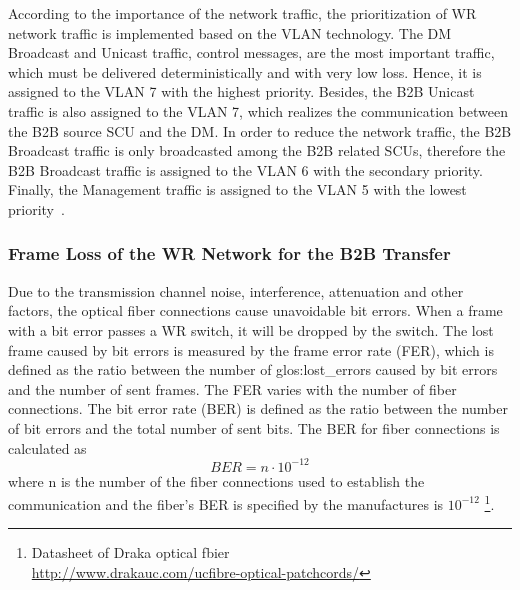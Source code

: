According to the importance of the network traffic, the prioritization of WR network traffic is implemented based on the VLAN technology. The DM Broadcast and Unicast traffic, control messages, are the most important traffic, which must be delivered  deterministically and with very low loss. Hence, it is assigned to the VLAN 7 with the highest priority. Besides, the B2B Unicast traffic is also assigned to the VLAN 7, which realizes the communication between the B2B source SCU and the DM. In order to reduce the network traffic, the B2B Broadcast traffic is only broadcasted among the B2B related SCUs, therefore the B2B Broadcast traffic is assigned to the VLAN 6 with the secondary priority. Finally, the Management traffic is assigned to the VLAN 5 with the lowest priority~\cite{prados_testing_2016}.




\subsubsection{Frame Loss of the WR Network for the B2B Transfer} 

Due to the transmission channel noise, interference, attenuation and other factors, the optical fiber connections cause unavoidable bit errors. When a frame with a bit error passes a WR switch, it will be dropped by the switch. The lost frame caused by bit errors is measured by the frame error rate (\gls{FER}), which is defined as the ratio between the number of \gls{glos:lost_error}s caused by bit errors and the number of sent frames. The FER varies with the number of fiber connections. The bit error rate (\gls{BER}) is defined as the ratio between the number of bit errors and the total number of sent bits. The BER for fiber connections is calculated as~\cite{prados_white_2011} 
\begin{equation}
	BER=n\cdot10^{-12}
\end{equation}
where n is the number of the fiber connections used to establish the communication and the fiber's BER is specified by the manufactures is $10^{-12}$ \footnote{Datasheet of Draka optical fbier \\ \url{http://www.drakauc.com/ucfibre-optical-patchcords/}}. 
 
